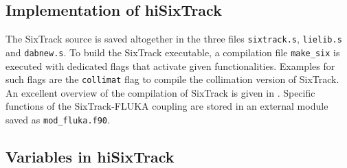 \begin{appendices}
\newpage

\section{Implementation of hiSixTrack} \label{chap:impl:hist}

The SixTrack source is saved altogether in the three files \lstinline{sixtrack.s}, \lstinline{lielib.s} and \mbox{\lstinline{dabnew.s}}. To build the SixTrack executable, a compilation file \lstinline{make_six} is executed with dedicated flags that activate given functionalities. Examples for such flags are the \lstinline{collimat} flag to compile the collimation version of SixTrack. An excellent overview of the compilation of SixTrack is given in \cite{Fjellstrom:1642385}. Specific functions of the SixTrack-FLUKA coupling are stored in an external module saved as \lstinline{mod_fluka.f90}. 



\subsection{Variables in hiSixTrack}


\end{appendices}
